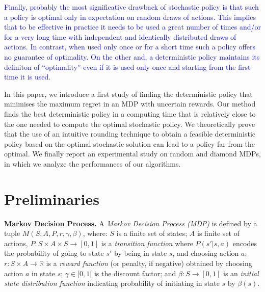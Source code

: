 \documentclass[runningheads,a4paper]{llncs}
\newcommand{\ET}[1]{{\textcolor{blue}{#1}}}
\begin{document}
\ET{
Finally, probably the most significative drawback of stochastic policy is that 
such a policy is 
optimal only in expectation on random draws of actions. This implies that to be effective in practice it needs to be used a great number of times and/or for a very long time with independent and identically distributed draws of actions. In contrast, when used only once or for a short time such a policy offers no guarantee of optimality. On the other and, a deterministic policy maintains its definiton of ``optimality'' even if it is used only once and starting from the first time it is used.
}

In this paper, we introduce a first study of finding the deterministic policy that minimises the maximum regret in an MDP with uncertain rewards. Our method finds the best deterministic policy in a computing time that is relatively close to the one needed to compute the optimal stochastic policy. 
We theoretically prove that the use of an intuitive rounding technique to obtain a feasible deterministic policy based on the optimal stochastic solution can lead to a policy far from the optimal. 
We finally report an experimental study on random and diamond MDPs, in which we analyze the performances of our algorithms. 








\section{Preliminaries}\label{sec:Preliminaries}

\textbf{Markov Decision Process.}  
A \textit{Markov Decision Process (MDP)} \citep{Puterman1994} is defined by a tuple $M(S, A, P, r, \gamma, \beta)$, where: $S$ is a finite set of states; $A$ is finite set of actions, $P: S \times A \times S \longrightarrow [0,1]$ is a \textit{transition function} where $P(s'|s,a)$ encodes the probability of going to state $s'$ by being in state $s$, and choosing action $a$; $r: S \times A \longrightarrow \mathbb{R}$ is a \textit{reward function} (or penalty, if negative) obtained by choosing action $a$ in state $s$; $\gamma \in [0, 1[$ is the discount factor; and $\beta: S \longrightarrow [0,1]$ is an \textit{initial state distribution function} indicating probability of initiating in state $s$ by $\beta(s)$.
\end{document}
